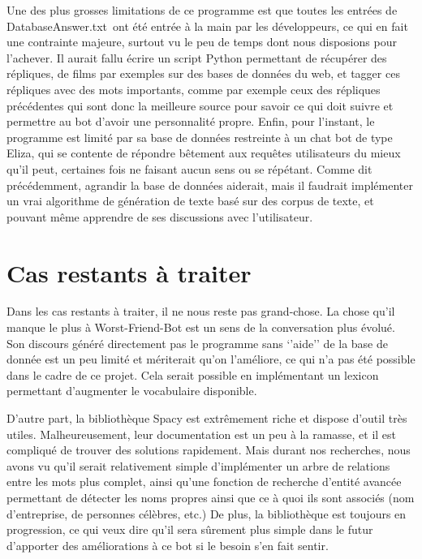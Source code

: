 \documentclass[paper=a4, fontsize=11pt]{article}
\begin{document}
	Une des plus grosses limitations de ce programme est que toutes les entrées de DatabaseAnswer.txt ont été entrée à la main par les développeurs, ce qui en fait une contrainte majeure, surtout vu le peu de temps dont nous disposions pour l’achever. Il aurait fallu écrire un script Python permettant de récupérer des répliques, de films par exemples sur des bases de données du web, et tagger ces répliques avec des mots importants, comme par exemple ceux des répliques précédentes qui sont donc la meilleure source pour savoir ce qui doit suivre et permettre au bot d’avoir une personnalité propre.
Enfin, pour l’instant, le programme est limité par sa base de données restreinte à un chat bot de type Eliza, qui se contente de répondre bêtement aux requêtes utilisateurs du mieux qu’il peut, certaines fois ne faisant aucun sens ou se répétant. Comme dit précédemment, agrandir la base de données aiderait, mais il faudrait implémenter un vrai algorithme de génération de texte basé sur des corpus de texte, et pouvant même apprendre de ses discussions avec l’utilisateur. 

\section{Cas restants à traiter}
Dans les cas restants à traiter, il ne nous reste pas grand-chose. La chose qu’il manque le plus à Worst-Friend-Bot est un sens de la conversation plus évolué. Son discours généré directement pas le programme sans ‘’aide’’ de la base de donnée est un peu limité et mériterait qu’on l’améliore, ce qui n’a pas été possible dans le cadre de ce projet. Cela serait possible en implémentant un lexicon permettant d’augmenter le vocabulaire disponible.

D’autre part, la bibliothèque Spacy est extrêmement riche et dispose d’outil très utiles. Malheureusement, leur documentation est un peu à la ramasse, et il est compliqué de trouver des solutions rapidement. Mais durant nos recherches, nous avons vu qu’il serait relativement simple d’implémenter un arbre de relations entre les mots plus complet, ainsi qu’une fonction de recherche d’entité avancée permettant de détecter les noms propres ainsi que ce à quoi ils sont associés (nom d’entreprise, de personnes célèbres, etc.) De plus, la bibliothèque est toujours en progression, ce qui veux dire qu’il sera sûrement plus simple dans le futur d’apporter des améliorations à ce bot si le besoin s’en fait sentir.
\end{document}
